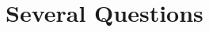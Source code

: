 \documentclass{report}
\begin{document}
	\hfill
	\section{Several Questions}
	\startsection
	\closesection
\end{document}
